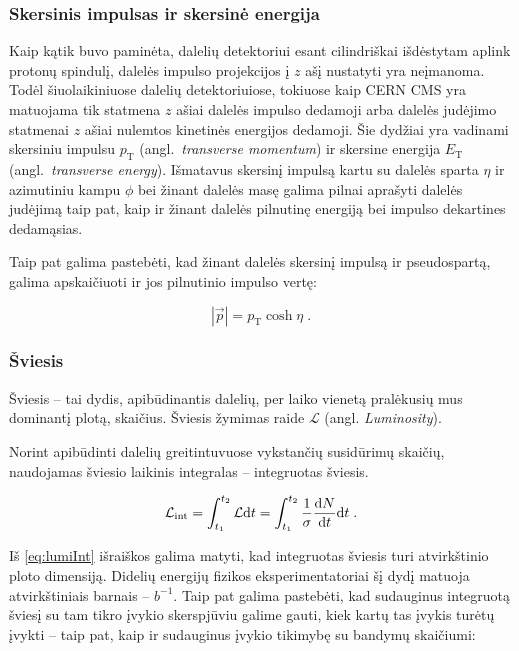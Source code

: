 \documentclass[a4paper, 12pt]{article}
\newcommand{\pT}{p_{\mathrm{T}}}
\newcommand{\ET}{E_{\mathrm{T}}}
\newcommand{\Lumi}{{\cal L}_\mathrm{int}}
\newlength\q
\begin{document}
\subsubsection*{Skersinis impulsas ir skersinė energija}
Kaip kątik buvo paminėta, dalelių detektoriui esant cilindriškai išdėstytam aplink protonų spindulį,
dalelės impulso projekcijos į $z$ ašį nustatyti yra neįmanoma.
Todėl šiuolaikiniuose dalelių detektoriuiose, tokiuose kaip CERN CMS yra matuojama tik statmena $z$
ašiai dalelės impulso dedamoji arba dalelės judėjimo statmenai $z$ ašiai nulemtos kinetinės energijos
dedamoji.
Šie dydžiai yra vadinami skersiniu impulsu $\pT$ (angl.\ \textit{transverse momentum}) ir
skersine energija $\ET$ (angl.\ \textit{transverse energy}).
Išmatavus skersinį impulsą kartu su dalelės sparta $\eta$ ir azimutiniu kampu $\phi$ bei žinant dalelės
masę galima pilnai aprašyti dalelės judėjimą taip pat, kaip ir žinant dalelės pilnutinę energiją bei
impulso dekartines dedamąsias.

Taip pat galima pastebėti, kad žinant dalelės skersinį impulsą ir pseudospartą, galima apskaičiuoti ir
jos pilnutinio impulso vertę:

\begin{equation}
	|\vec p|=p_{\mathrm{T}}\cosh\eta \; .
	\label{eq:pmodpt}
\end{equation}


\subsubsection*{Šviesis}

Šviesis -- tai dydis, apibūdinantis dalelių, per laiko vienetą pralėkusių mus
dominantį plotą, skaičius. Šviesis žymimas raide $\mathcal{L}$ (angl. \textit{Luminosity}).

Norint apibūdinti dalelių greitintuvuose vykstančių susidūrimų skaičių, naudojamas šviesio
laikinis integralas -- integruotas šviesis.

\begin{equation}
	\Lumi=\int_{t_1}^{t_2} \mathcal{L}\mathrm{d}t =
	\int_{t_1}^{t_2} \frac{1}{\sigma}\frac{\mathrm{d}N}{\mathrm{d}t} \mathrm{d}t \; .
\label{eq:lumiInt}
\end{equation}

Iš \eqref{eq:lumiInt} išraiškos galima matyti, kad integruotas šviesis turi atvirkštinio ploto
dimensiją.
Didelių energijų fizikos eksperimentatoriai šį dydį matuoja atvirkštiniais barnais -- $b^{-1}$.
Taip pat galima pastebėti, kad sudauginus integruotą šviesį su tam tikro įvykio skerspjūviu
galime gauti, kiek kartų tas įvykis turėtų įvykti -- taip pat, kaip ir sudauginus įvykio tikimybę
su bandymų skaičiumi:
\end{document}

